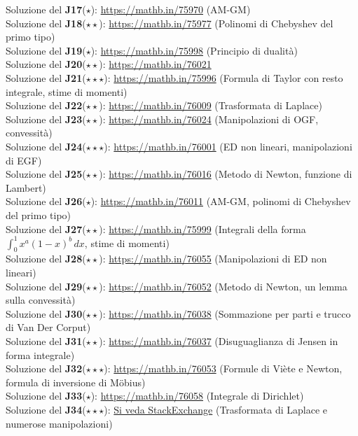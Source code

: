 \documentclass[a4paper,twoside]{article}
\theoremstyle{definition}
\numberwithin{theorem}{section}
\begin{document}
Soluzione del \textbf{J17}($\star$): \url{https://mathb.in/75970} (AM-GM)\\
Soluzione del \textbf{J18}($\star\star$): \url{https://mathb.in/75977} (Polinomi di Chebyshev del primo tipo)\\
Soluzione del \textbf{J19}($\star$): \url{https://mathb.in/75998} (Principio di dualità) \\
Soluzione del \textbf{J20}($\star\star$): \url{https://mathb.in/76021} \\
Soluzione del \textbf{J21}($\star\star\star$): \url{https://mathb.in/75996} (Formula di Taylor con resto integrale, stime di momenti)\\
Soluzione del \textbf{J22}($\star\star$): \url{https://mathb.in/76009} (Trasformata di Laplace)\\
Soluzione del \textbf{J23}($\star\star$): \url{https://mathb.in/76024} (Manipolazioni di OGF, convessità)\\
Soluzione del \textbf{J24}($\star\star\star$): \url{https://mathb.in/76001} (ED non lineari, manipolazioni di EGF) \\
Soluzione del \textbf{J25}($\star\star$): \url{https://mathb.in/76016} (Metodo di Newton, funzione di Lambert)\\
Soluzione del \textbf{J26}($\star$): \url{https://mathb.in/76011} (AM-GM, polinomi di Chebyshev del primo tipo) \\
Soluzione del \textbf{J27}($\star\star$): \url{https://mathb.in/75999} (Integrali della forma $\int_{0}^{1}x^a(1-x)^b\,dx$, stime di momenti)\\
Soluzione del \textbf{J28}($\star\star$): \url{https://mathb.in/76055} (Manipolazioni di ED non lineari) \\
Soluzione del \textbf{J29}($\star\star$): \url{https://mathb.in/76052} (Metodo di Newton, un lemma sulla convessità)\\
Soluzione del \textbf{J30}($\star\star$): \url{https://mathb.in/76038} (Sommazione per parti e trucco di Van Der Corput)\\
Soluzione del \textbf{J31}($\star\star$): \url{https://mathb.in/76037} (Disuguaglianza di Jensen in forma integrale)\\
Soluzione del \textbf{J32}($\star\star\star$): \url{https://mathb.in/76053} (Formule di Viète e Newton, formula di inversione di M\"obius)  \\
Soluzione del \textbf{J33}($\star$): \url{https://mathb.in/76058} (Integrale di Dirichlet)\\
Soluzione del \textbf{J34}($\star\star\star$): \href{https://math.stackexchange.com/questions/2442091/a-ramanujan-sum/2442175#2442175}{Si veda StackExchange} (Trasformata di Laplace e numerose manipolazioni)\\
\end{document}
